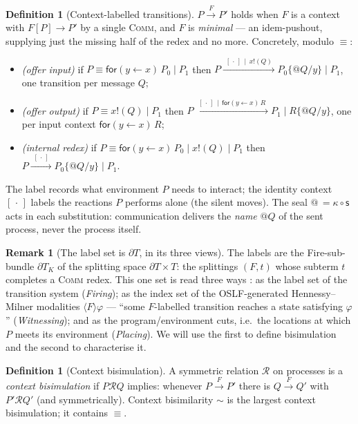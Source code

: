 \documentclass[11pt]{article}
\makeatletter
\newcommand{\swp}{\mathsf{s}}                  %
\newcommand{\kt}{\kappa}                       %
\newcommand{\Par}{\mathbin{\mid}}
\newcommand{\inp}[3]{\mathsf{for}(#1 \leftarrow #2)\,#3}
\newcommand{\out}[2]{#1\mathbin{!}(#2)}
\newcommand{\quo}[1]{@#1}
\newcommand{\lts}[1]{\xrightarrow{\,#1\,}}
\newcommand{\bis}{\sim}
\newcommand{\scong}{\equiv}
\newcommand{\hole}{[\,\cdot\,]}                %
\newcommand{\DK}{\partial T_{K}}               %
\newcommand{\plug}[2]{#1[#2]}                  %
\theoremstyle{plain}
\theoremstyle{definition}
\newtheorem{definition}[theorem]{Definition}
\newtheorem{remark}[theorem]{Remark}
\makeatother
\begin{document}
\begin{definition}[Context-labelled transitions]\label{def:ctx-lts}
$P\lts F P'$ holds when $F$ is a context with $\plug F P\longrightarrow P'$ by a
single \textsc{Comm}, and $F$ is \emph{minimal} --- an idem-pushout, supplying just
the missing half of the redex and no more. Concretely, modulo $\scong$:
\begin{itemize}[nosep]
  \item \emph{(offer input)} if $P\scong\inp y x{P_0}\Par P_1$ then
        $P\lts{\ \hole\,\Par\,\out x Q\ } P_0\{\quo Q/y\}\Par P_1$, one transition
        per message $Q$;
  \item \emph{(offer output)} if $P\scong\out x Q\Par P_1$ then
        $P\lts{\ \hole\,\Par\,\inp y x R\ } P_1\Par R\{\quo Q/y\}$, one per input
        context $\inp y x R$;
  \item \emph{(internal redex)} if $P\scong\inp y x{P_0}\Par\out x Q\Par P_1$ then
        $P\lts{\ \hole\ } P_0\{\quo Q/y\}\Par P_1$.
\end{itemize}
The label records what environment $P$ needs to interact; the identity context
$\hole$ labels the reactions $P$ performs alone (the silent moves). The seal
$\quo{\,}=\kt\circ\swp$ acts in each substitution: communication delivers the
\emph{name} $\quo Q$ of the sent process, never the process itself.
\end{definition}

\begin{remark}[The label set is $\partial T$, in its three views]\label{rem:dT}
The labels are the Fire-sub-bundle $\DK$ of the splitting space $\partial T\times T$:
the splittings $(F,t)$ whose subterm $t$ completes a \textsc{Comm} redex. This one
set is read three ways \cite{meredithwells}: as the label set of the transition
system (\emph{Firing}); as the index set of the OSLF-generated Hennessy--Milner
modalities $\langle F\rangle\varphi$ --- ``some $F$-labelled transition reaches a
state satisfying $\varphi$'' (\emph{Witnessing}); and as the program/environment
cuts, i.e.\ the locations at which $P$ meets its environment (\emph{Placing}). We
will use the first to define bisimulation and the second to characterise it.
\end{remark}

\begin{definition}[Context bisimulation]\label{def:bis}
A symmetric relation $\mathcal R$ on processes is a \emph{context bisimulation} if
$P\mathrel{\mathcal R}Q$ implies: whenever $P\lts F P'$ there is $Q\lts F Q'$ with
$P'\mathrel{\mathcal R}Q'$ (and symmetrically). Context bisimilarity $\bis$ is the
largest context bisimulation; it contains $\scong$.
\end{definition}
\end{document}
